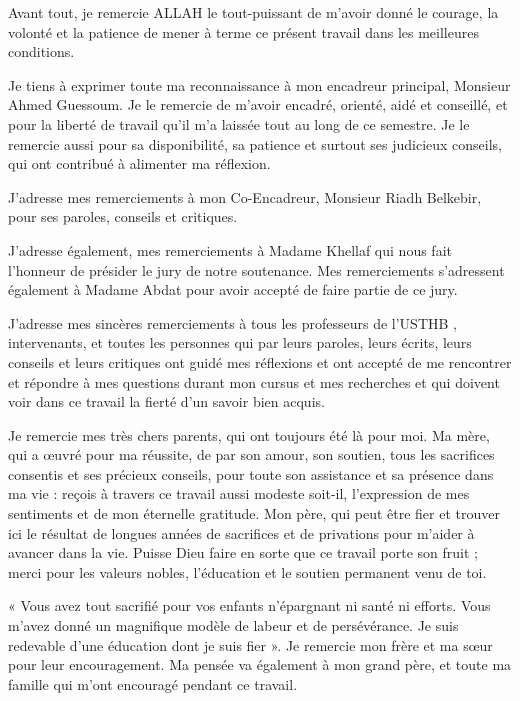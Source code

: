 
\vspace{1.5cm}

\setlength{\parindent}{0.5cm}
Avant tout, je remercie ALLAH le tout-puissant de m'avoir donné le courage, la volonté et la patience de mener à terme ce présent travail dans les meilleures conditions.

Je tiens à exprimer toute ma reconnaissance à mon encadreur principal, Monsieur Ahmed Guessoum. Je le remercie de m’avoir encadré, orienté, aidé et conseillé, et pour la liberté de travail qu'il m'a laissée tout au long de ce semestre. 
Je le remercie aussi pour sa disponibilité, sa patience et surtout ses judicieux conseils, qui ont contribué à alimenter ma réflexion.

J’adresse mes remerciements à mon Co-Encadreur, Monsieur Riadh Belkebir, pour ses paroles, conseils et critiques.

J'adresse également, mes remerciements à Madame Khellaf qui nous fait l'honneur de présider le jury de notre soutenance. Mes remerciements s’adressent également à Madame Abdat pour avoir accepté de faire partie de ce jury.

J’adresse mes sincères remerciements à tous les professeurs de l'USTHB , intervenants, et toutes les personnes qui par leurs paroles, leurs écrits, leurs conseils et leurs critiques ont guidé mes réflexions et ont accepté de me rencontrer et répondre à mes questions durant mon cursus et mes recherches et qui doivent voir dans ce travail la fierté d'un savoir bien acquis.

Je remercie mes très chers parents, qui ont toujours été là pour moi. Ma mère, qui a œuvré pour ma réussite, de par son amour, son soutien, tous les sacrifices consentis et ses précieux conseils, pour toute son assistance et sa présence dans ma vie : reçois à travers ce travail aussi modeste soit-il, l'expression de mes sentiments et de mon éternelle gratitude. Mon père, qui peut être fier et trouver ici le résultat de longues années de sacrifices et de privations pour m'aider à avancer dans la vie. Puisse Dieu faire en sorte que ce travail porte son fruit ; merci pour les valeurs nobles, l'éducation et le soutien permanent venu de toi.

« Vous avez tout sacrifié pour vos enfants n’épargnant ni santé ni efforts. Vous m’avez donné un magnifique modèle de labeur et de persévérance. Je suis redevable d’une éducation dont je suis fier ».
Je remercie mon frère et ma sœur pour leur encouragement. Ma pensée va également à mon grand père, et toute ma famille qui m'ont encouragé pendant ce travail.

